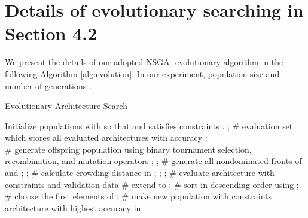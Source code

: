 \documentclass[10pt,twocolumn,letterpaper]{article}
\begin{document}
\appendix


\setcounter{table}{4}
\setcounter{figure}{4}
\setcounter{algorithm}{2}

\section{Details of evolutionary searching in Section 4.2}
We present the details of our adopted NSGA- \cite{deb2002fast} evolutionary algorithm in the following Algorithm \ref{alg:evolution}. In our experiment, population size  and number of generations .

\begin{algorithm*}[h]
	\caption{Evolutionary Architecture Search}
	\label{alg:evolution}
	\begin{algorithmic}[1]
		\STATE Initialize populations  with  so that  and  satisfies constraints . 
		\STATE ; \hspace{5cm} \# evaluation set  which stores all evaluated architectures with accuracy
		\FOR{}
		\STATE ; \\
		\hspace{1cm}		\# generate offspring population  using binary tournament selection, recombination, and mutation operators
		\STATE ; 
		\STATE ; \hspace{4.5cm}  \# generate all nondominated fronts of 
		\STATE  and ;  
		\WHILE { }
		\STATE ; \hspace{5cm} {\# calculate crowding-distance in }
		\STATE ;
		\STATE ;
		\ENDWHILE
		\STATE ; \hspace{1cm}  \# evaluate architecture with constraints and validation data
		\STATE  \hspace{11.7cm}  \# extend  to 
		\STATE ;  \hspace{9cm} \# sort in descending order using 
		\STATE ; \hspace{3.3cm} \# choose the first  elements of  
		\STATE ; \hspace{5.5cm} \# make new population with constraints 
		\ENDFOR
		\RETURN architecture with highest accuracy in 
	\end{algorithmic}
\end{algorithm*}
\end{document}
